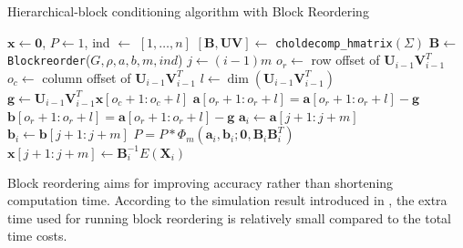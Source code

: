 \begin{algorithm}[!h]
    \caption{Hierarchical-block conditioning algorithm with Block Reordering}
    \begin{algorithmic}
            \State $\mathbf{x} \leftarrow \mathbf{0}$, $P \leftarrow 1$, ind $\leftarrow$ $[1,\dots, n]$
            \State $[\mathbf{B}, \mathbf{UV}] \leftarrow$ \texttt{choldecomp\_hmatrix}$(\Sigma)$
            \State $\mathbf{B} \leftarrow$ \texttt{Blockreorder}($G, \rho, a, b, m, ind$)
                \State $j \leftarrow (i-1)m$
                    \State $o_r \leftarrow$ row offset of $\mathbf{U}_{i-1}\mathbf{V}_{i-1}^T$
                    \State $o_c \leftarrow$ column offset of $\mathbf{U}_{i-1}\mathbf{V}_{i-1}^T$
                    \State $l \leftarrow \dim(\mathbf{U}_{i-1}\mathbf{V}_{i-1}^T)$
                    \State $\mathbf{g} \leftarrow \mathbf{U}_{i-1}\mathbf{V}_{i-1}^T\mathbf{x}[o_c+1:o_c+l]$
                    \State $\mathbf{a}[o_r+1:o_r+l] = \mathbf{a}[o_r+1:o_r+l] - \mathbf{g}$
                    \State $\mathbf{b}[o_r+1:o_r+l] = \mathbf{a}[o_r+1:o_r+l] - \mathbf{g}$
                \EndIf
                \State $\mathbf{a}_i \leftarrow \mathbf{a}[j+1:j+m]$
                \State $\mathbf{b}_i \leftarrow \mathbf{b}[j+1:j+m]$
                \State $P = P*\Phi_m(\mathbf{a}_i, \mathbf{b}_i; \mathbf{0}, \mathbf{B}_i\mathbf{B}_i^T)$
                \State $\mathbf{x}[j+1:j+m] \leftarrow \mathbf{B}_{i}^{-1} E(\mathbf{X}_i)$
            \EndFor
        \EndProcedure
    \end{algorithmic}\label{alg:hmvn_bro}
\end{algorithm}

Block reordering aims for improving accuracy rather than shortening computation time. According to the simulation result introduced in \citet{cao2019hierarchical}, the extra time used for running block reordering is relatively small compared to the total time costs. 



